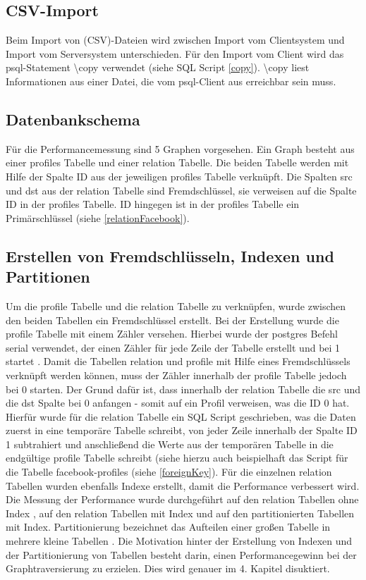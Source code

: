 \subsection{CSV-Import}
Beim Import von (CSV)-Dateien wird zwischen Import vom Clientsystem und  Import vom Serversystem unterschieden.
Für den Import vom Client wird das psql-Statement \textbackslash copy verwendet (siehe SQL Script \ref{copy}).
\textbackslash copy liest Informationen aus einer Datei,
die vom psql-Client aus erreichbar sein muss. \cite{postgres2018}

\subsection{Datenbankschema}
Für die Performancemessung sind 5 Graphen vorgesehen. Ein Graph besteht aus einer profiles Tabelle und einer relation Tabelle. Die beiden Tabelle werden mit Hilfe der
Spalte ID aus der jeweiligen profiles Tabelle verknüpft. Die Spalten src und dst aus der relation Tabelle sind Fremdschlüssel, sie verweisen auf die Spalte ID in der
profiles Tabelle. ID hingegen ist in der profiles Tabelle ein Primärschlüssel (siehe \ref{relationFacebook}).

\subsection{Erstellen von Fremdschlüsseln, Indexen und Partitionen}
Um die profile Tabelle und die relation Tabelle zu verknüpfen, wurde zwischen den beiden Tabellen ein Fremdschlüssel erstellt. Bei der Erstellung wurde die profile Tabelle
mit einem Zähler versehen. Hierbei wurde der postgres Befehl serial verwendet, der einen Zähler für jede Zeile der Tabelle erstellt und bei 1 startet . Damit die Tabellen
relation und profile mit Hilfe eines Fremdschlüssels verknüpft werden können, muss der Zähler innerhalb der profile Tabelle jedoch bei 0 starten. Der Grund dafür ist, dass
innerhalb der relation Tabelle die src und die dst Spalte bei 0 anfangen - somit auf ein Profil verweisen, was die ID 0 hat. Hierfür wurde für die relation Tabelle ein
SQL Script geschrieben, was die Daten zuerst in eine temporäre Tabelle schreibt, von jeder Zeile innerhalb der Spalte ID 1 subtrahiert und anschließend die Werte aus
der temporären Tabelle in die endgültige profile Tabelle schreibt (siehe hierzu auch beispielhaft das Script für die Tabelle facebook-profiles (siehe \ref{foreignKey}).
Für die einzelnen relation Tabellen wurden ebenfalls Indexe erstellt, damit die Performance verbessert wird. Die Messung der Performance wurde durchgeführt auf
den relation Tabellen ohne Index , auf den relation Tabellen mit Index und auf den partitionierten Tabellen mit Index. Partitionierung bezeichnet das Aufteilen einer
großen Tabelle in mehrere kleine Tabellen \cite{postgrespartitioning} . Die Motivation hinter der Erstellung von Indexen und der Partitionierung von Tabellen besteht darin,
einen Performancegewinn bei der Graphtraversierung zu erzielen. Dies wird genauer im 4. Kapitel disuktiert.

